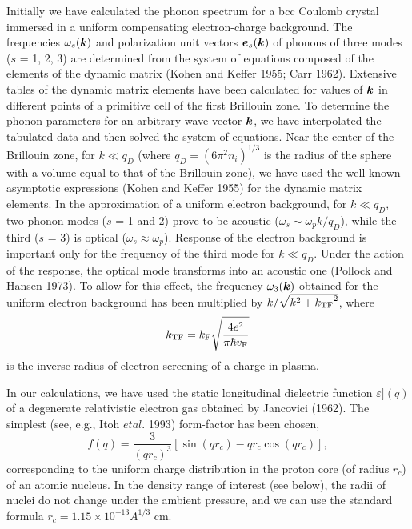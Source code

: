 Initially we have calculated the phonon spectrum for a bcc
Coulomb crystal immersed in a uniform compensating 
electron-charge background. The frequencies $\omega_s(\mbox{\boldmath $k$})$ and 
polarization unit vectors $\mbox{\boldmath $e$}_s(\mbox{\boldmath $k$})$ of phonons of three
modes ($s$ = 1, 2, 3) are determined from the system of equations
composed of the elements of the dynamic matrix (Kohen and Keffer
1955; Carr 1962). Extensive tables of the dynamic matrix elements 
have been calculated for values of $\mbox{\boldmath $k$}$ in different
points of a primitive cell of the first Brillouin zone. 
To determine the phonon parameters for an arbitrary wave vector $\mbox{\boldmath $k$}$,
we have interpolated the tabulated data and then solved 
the system of equations. Near the center of the Brillouin zone, 
for $k \ll q_D$ (where $q_D = (6 \pi^2 n_i)^{1/3}$ is
the radius of the sphere with a volume equal to that of the
Brillouin zone), we have used the well-known asymptotic expressions
(Kohen and Keffer 1955) for the dynamic matrix elements.
In the approximation of a uniform electron background, for $k \ll q_D$,
two phonon modes ($s$ = 1 and 2) prove to be acoustic ($\omega_s \sim 
\omega_p k/q_D$), while the third ($s$ = 3) is optical ($\omega_s 
\approx \omega_p$). Response of the electron background is 
important only for the frequency of the third mode for $k \ll q_D$.
Under the action of the response, the optical mode transforms
into an acoustic one (Pollock and Hansen 1973). 
To allow for this effect, the frequency $\omega_3(\mbox{\boldmath $k$})$
obtained for the uniform electron background has been
multiplied by $k/ \sqrt{k^2+\mbox{$k_{\rm TF}$}^2}$, where
%
\begin{equation}
     \mbox{$k_{\rm TF}$} = \mbox{$k_{\rm F}$} \sqrt{{4e^2  \over \pi \hbar \mbox{$v_{\rm F}$}}}
\label{eq:kTF}
\end{equation}
%
is the inverse radius of electron screening of a charge in
plasma.

In our calculations, we have used the static longitudinal 
dielectric function $\varepsilon](q)$ of a degenerate relativistic 
electron gas obtained by Jancovici (1962). 
The simplest (see, e.g., Itoh $et al.$ 1993) form-factor has been chosen,
%
\begin{equation}
       f(q) = \frac{3}{(q r_c)^3}
               \left[ \sin(q r_c) - q r_c \cos(q r_c) \right],
\label{eq:formfactor}
\end{equation}
%
corresponding to the uniform charge distribution in the proton
core (of  radius $r_c$) of an atomic nucleus. In the density range of
interest (see below), the radii of nuclei do not change under the
ambient pressure, and we can use the standard formula $r_c = 1.15 
\times 10^{-13} A^{1/3}$ cm.

